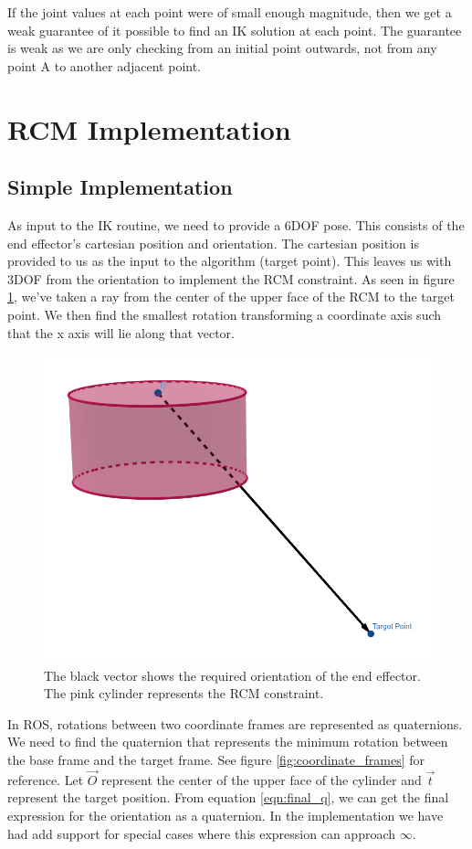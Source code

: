 \documentclass[BTech]{iitmdiss}
\begin{document}
    If the joint values at each point were of small enough magnitude, then we get a weak guarantee of it possible to find an IK solution at each point.
    The guarantee is weak as we are only checking from an initial point outwards, not from any point A to another adjacent point.


    \section{RCM Implementation}

    \subsection{Simple Implementation}\label{subsec:simple-rcm-impl}

    As input to the IK routine, we need to provide a 6DOF pose.
    This consists of the end effector's cartesian position and orientation.
    The cartesian position is provided to us as the input to the algorithm (target point).
    This leaves us with 3DOF from the orientation to implement the RCM constraint.
    As seen in figure \ref{fig:target_orientation}, we've taken a ray from the center of the upper face of the RCM to the target point.
    We then find the smallest rotation transforming a coordinate axis such that the x axis will lie along that vector.

    \begin{figure}
        \centering
        \includegraphics[width=0.5 \linewidth]{./img/target_orientation}
        \caption{The black vector shows the required orientation of the end effector. The pink cylinder represents the RCM constraint.}
        \label{fig:target_orientation}
    \end{figure}


    In ROS, rotations between two coordinate frames are represented as quaternions.
    We need to find the quaternion that represents the minimum rotation between the base frame and the target frame.
    See figure \ref{fig:coordinate_frames} for reference.
    Let $\vec{O}$ represent the center of the upper face of the cylinder and $\vec{t}$ represent the target position.
    From equation \ref{eqn:final_q}, we can get the final expression for the orientation as a quaternion.
    In the implementation we have had add support for special cases where this expression can approach $\infty$.
\end{document}
